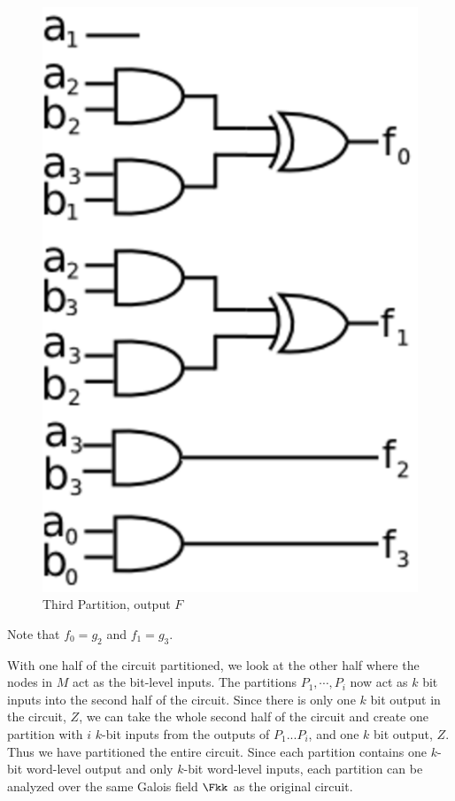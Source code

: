 \begin{Example}
\begin{figure}[H]
	\begin{center}
	\includegraphics[scale=0.8]{figures/part3.eps}
	\end{center}
	\caption{Third Partition, output $F$}
	\label{fig:part3}
\end{figure}

Note that $f_0=g_2$ and $f_1=g_3$.
\label{exp:mul4inputparts}
\end{Example}

With one half of the circuit partitioned, we look at the other half 
where the nodes in $M$ act as the bit-level inputs. 
The partitions $P_1, \cdots, P_i$ now act as $k$ bit inputs into the second 
half of the circuit. Since there is only one $k$ bit output in the circuit, 
$Z$, we can take the whole second half of the circuit and create one 
partition with $i$ $k$-bit inputs from the outputs of $P_1...P_i$, and one 
$k$ bit output, $Z$. Thus we have partitioned the entire circuit. Since each
partition contains one $k$-bit word-level output and only $k$-bit word-level
inputs, each partition can be analyzed over the same Galois field $\Fkk$ as
the original circuit.


